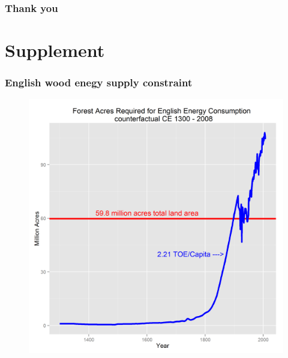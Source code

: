 \documentclass[final]{beamer}
\begin{document}
\begin{frame}
\frametitle{Thank you}
\end{frame}

\section{Supplement}

\begin{frame}
\frametitle{English wood enegy supply constraint}
\begin{figure}[p!]
\center
\label{fig:wood}
\includegraphics[height=0.8\textheight]{wood}
\end{figure}
\end{frame}
\end{document}
